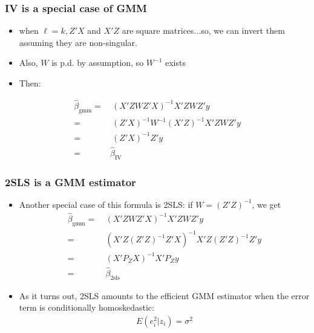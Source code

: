 \documentclass[a4paper,twoside,11pt]{article}
\begin{document}
\subsubsection{IV is a special case of GMM}
\begin{itemize}
    \item when $\ell = k, Z'X$ and $X'Z$ are square matrices...so, we can invert them assuming they are non-singular.
    \item Also, $W$ is p.d. by assumption, so $W^{-1}$ exists
    \item Then:
\end{itemize}
\begin{equation*}
\begin{aligned}
\hat{\beta}_{\text{gmm}} =& \ (X'ZWZ'X)^{-1} X'ZWZ'y \\
=& \ (Z'X)^{-1} W^{-1} (X'Z)^{-1} X'ZWZ'y \\
=& \ (Z'X)^{-1} Z'y \\
=& \hat{\beta}_{\text{IV}}
\end{aligned} 
\end{equation*}
\subsubsection{2SLS is a GMM estimator}
\begin{itemize}
    \item Another special case of this formula is 2SLS: if $W=(Z'Z)^{-1}$, we get
\begin{equation*}
\begin{aligned}
\hat{\beta}_{\text{gmm}} =& \ (X'ZWZ'X)^{-1} X'ZWZ'y \\
=& \ (X'Z(Z'Z)^{-1}Z'X)^{-1} X'Z(Z'Z)^{-1}Z'y
\\
=& \ (X'P_Z X)^{-1} X'P_Z y \\
=& \ \hat{\beta}_{\text{2sls}}
\end{aligned} 
\end{equation*}
    \item As it turns out, 2SLS amounts to the efficient GMM estimator when the error term is conditionally homoskedastic:
\begin{equation*}
\begin{aligned}
E(e_i^2 | z_i) = \sigma^2
\end{aligned} 
\end{equation*}
\end{itemize}
\end{document}
